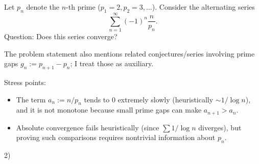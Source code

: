 Let $p_n$ denote the $n$-th prime ($p_1=2,p_2=3,\dots$).
Consider the alternating series
\[
\sum_{n=1}^\infty (-1)^n \frac{n}{p_n}.
\]
Question: Does this series converge?

The problem statement also mentions related conjectures/series involving prime gaps $g_n:=p_{n+1}-p_n$; I treat those as auxiliary.

Stress points:
\begin{itemize}
\item The term $a_n:=n/p_n$ tends to $0$ extremely slowly (heuristically $\sim 1/\log n$), and it is not monotone because small prime gaps can make $a_{n+1}>a_n$.
\item Absolute convergence fails heuristically (since $\sum 1/\log n$ diverges), but proving such comparisons requires nontrivial information about $p_n$.
\end{itemize}

2)
